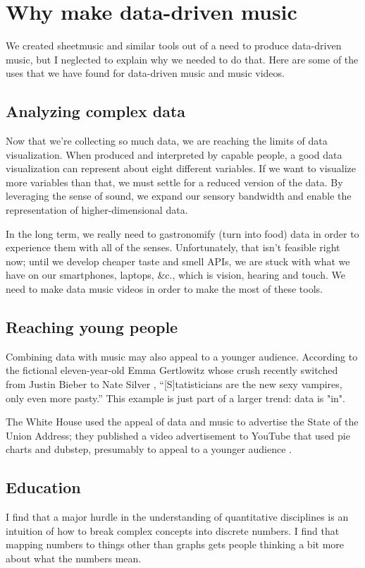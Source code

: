 \documentclass{acm_proc_article-sp}
\begin{document}
\section{Why make data-driven music}
We created sheetmusic and similar tools out of a need to produce
data-driven music, but I neglected to explain why we needed to do
that. Here are some of the uses that we have found for data-driven
music and music videos.

\subsection{Analyzing complex data}
Now that we're collecting so much data, we are reaching the limits of
data visualization. When produced and interpreted by capable people,
a good data visualization can represent about eight different variables.
If we want to visualize more variables than that, we must settle for
a reduced version of the data. By leveraging the sense of sound,
we expand our sensory bandwidth and enable the representation of
higher-dimensional data.

In the long term, we really need to gastronomify (turn into food)
data in order to experience them with all of the senses.
Unfortunately, that isn't feasible right now;
until we develop cheaper taste and smell APIs, we are stuck with what we have
on our smartphones, laptops, \&c., which is vision, hearing and touch. We need
to make data music videos in order to make the most of these tools.

\subsection{Reaching young people}
Combining data with music may also appeal to a younger audience.
According to the fictional eleven-year-old Emma Gertlowitz whose crush
recently switched from Justin Bieber to Nate Silver \cite{emma},
``[S]tatisticians are the new sexy vampires, only even more pasty.''
This example is just part of a larger trend: data is "in".

The White House used the appeal of data and music to advertise the State
of the Union Address; they published a video advertisement to YouTube that
used pie charts and dubstep, presumably to appeal to a younger audience \cite{whitehouse}.

\subsection{Education}
I find that a major hurdle in the understanding of quantitative disciplines
is an intuition of how to break complex concepts into discrete numbers.
I find that mapping numbers to things other than graphs gets people thinking
a bit more about what the numbers mean.
\end{document}
